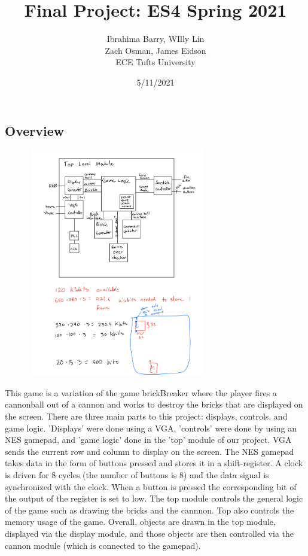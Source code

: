 \documentclass[12pt]{article}
\title{Final Project: ES4 Spring 2021}
\date{5/11/2021}
\author{Ibrahima Barry, WIlly Lin \\ Zach Osman, James Eidson \\ ECE Tufts University}
\begin{document}
\maketitle

\begin{flushleft}

\section{Overview}
\begin{center}
\includegraphics[width=10cm, height=10cm]{blockDiagram}
\end{center}
This game is a variation of the game brickBreaker where the player fires a
cannonball out of a cannon and works to destroy the bricks that are displayed on
the screen. There are three main parts to this project: displays, controls, and
game logic. 'Displays' were done using a VGA, 'controls' were done by using
an NES gamepad, and 'game logic' done in the 'top' module of our project. 
VGA sends the current row and column to display on the screen. The NES gamepad
takes data in the form of buttons pressed and stores it in a shift-register. A
clock is driven for 8 cycles (the number of buttons is 8) and the data signal is
synchronized with the clock. When a button is pressed the corresponding bit of
the output of the register is set to low. The top module controls the general
logic of the game such as drawing the bricks and the cannnon. Top also controls
the memory usage of the game. Overall, objects are drawn in the top module,
displayed via the display module, and those objects are then controlled via the
cannon module (which is connected to the gamepad). 


\end{flushleft}
\end{document}
